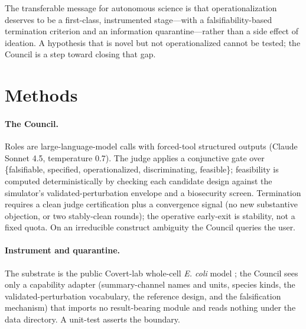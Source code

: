 \documentclass[11pt]{article}
\begin{document}
The transferable message for autonomous science is that operationalization deserves to be a first-class,
instrumented stage---with a falsifiability-based termination criterion and an information quarantine---rather
than a side effect of ideation. A hypothesis that is novel but not operationalized cannot be tested; the
Council is a step toward closing that gap.

\section{Methods}
\paragraph{The Council.} Roles are large-language-model calls with forced-tool structured outputs
(Claude Sonnet 4.5, temperature 0.7). The judge applies a conjunctive gate over
\{falsifiable, specified, operationalized, discriminating, feasible\}; feasibility is computed deterministically
by checking each candidate design against the simulator's validated-perturbation envelope and a biosecurity
screen. Termination requires a clean judge certification plus a convergence signal (no new substantive
objection, or two stably-clean rounds); the operative early-exit is stability, not a fixed quota. On an
irreducible construct ambiguity the Council queries the user.

\paragraph{Instrument and quarantine.} The substrate is the public Covert-lab whole-cell \emph{E. coli} model
\citep{macklin2020ecoli}; the Council sees only a capability adapter (summary-channel names and units, species
kinds, the validated-perturbation vocabulary, the reference design, and the falsification mechanism) that
imports no result-bearing module and reads nothing under the data directory. A unit-test asserts the boundary.
\end{document}
